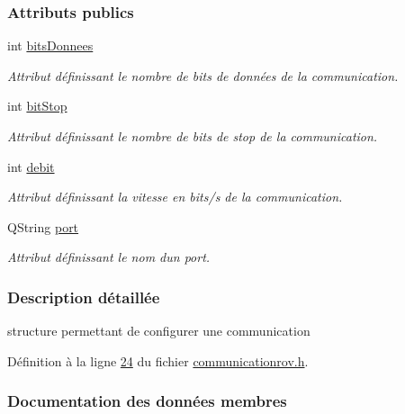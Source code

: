 \subsubsection*{Attributs publics}
\begin{DoxyCompactItemize}
\item 
int \hyperlink{struct_configuration_a37e0691e4a25b11bd86a52bc68c81f93}{bits\+Donnees}
\begin{DoxyCompactList}\small\item\em Attribut définissant le nombre de bits de données de la communication. \end{DoxyCompactList}\item 
int \hyperlink{struct_configuration_a9c24ff9a3e5a24b14e1ac8bc03de907d}{bit\+Stop}
\begin{DoxyCompactList}\small\item\em Attribut définissant le nombre de bits de stop de la communication. \end{DoxyCompactList}\item 
int \hyperlink{struct_configuration_ab714d6036189bf451e566e6c6a971c85}{debit}
\begin{DoxyCompactList}\small\item\em Attribut définissant la vitesse en bits/s de la communication. \end{DoxyCompactList}\item 
Q\+String \hyperlink{struct_configuration_acc40b4f298cb215a94fb43976ef7d3a8}{port}
\begin{DoxyCompactList}\small\item\em Attribut définissant le nom d\textquotesingle{}un port. \end{DoxyCompactList}\end{DoxyCompactItemize}


\subsubsection{Description détaillée}
structure permettant de configurer une communication 

Définition à la ligne \hyperlink{communicationrov_8h_source_l00024}{24} du fichier \hyperlink{communicationrov_8h_source}{communicationrov.\+h}.



\subsubsection{Documentation des données membres}
\mbox{\label{struct_configuration_a37e0691e4a25b11bd86a52bc68c81f93}} 

